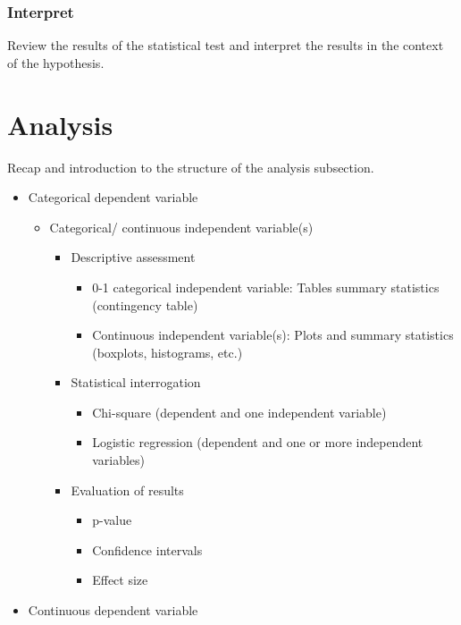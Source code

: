 \documentclass[
  letterpaper,
]{latex/krantz}
\providecommand{\tightlist}{%
  \setlength{\itemsep}{0pt}\setlength{\parskip}{0pt}}\usepackage{longtable,booktabs,array}
\begin{document}
\hypertarget{ida-interpret}{%
\subsubsection{Interpret}\label{ida-interpret}}

Review the results of the statistical test and interpret the results in
the context of the hypothesis.

\hypertarget{ida-analysis}{%
\section{Analysis}\label{ida-analysis}}

Recap and introduction to the structure of the analysis subsection.

\begin{itemize}
\tightlist
\item
  Categorical dependent variable

  \begin{itemize}
  \tightlist
  \item
    Categorical/ continuous independent variable(s)

    \begin{itemize}
    \tightlist
    \item
      Descriptive assessment

      \begin{itemize}
      \tightlist
      \item
        0-1 categorical independent variable: Tables summary statistics
        (contingency table)
      \item
        Continuous independent variable(s): Plots and summary statistics
        (boxplots, histograms, etc.)
      \end{itemize}
    \item
      Statistical interrogation

      \begin{itemize}
      \tightlist
      \item
        Chi-square (dependent and one independent variable)
      \item
        Logistic regression (dependent and one or more independent
        variables)
      \end{itemize}
    \item
      Evaluation of results

      \begin{itemize}
      \tightlist
      \item
        p-value
      \item
        Confidence intervals
      \item
        Effect size
      \end{itemize}
    \end{itemize}
  \end{itemize}
\item
  Continuous dependent variable


\end{itemize}
\end{document}

